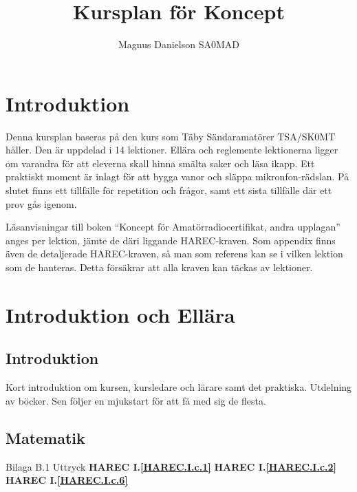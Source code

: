\documentclass[a4paper,twoside,openright]{article}
\begin{document}
\frontmatter

\title{Kursplan för Koncept}
\author{Magnus Danielson SA0MAD}
\maketitle

\section*{Introduktion}

Denna kursplan baseras på den kurs som Täby Sändaramatörer TSA/SK0MT håller.
Den är uppdelad i 14 lektioner.
Ellära och reglemente lektionerna ligger om varandra för att eleverna skall
hinna smälta saker och läsa ikapp.
Ett praktiskt moment är inlagt för att bygga vanor och släppa mikronfon-rädslan.
På slutet finns ett tillfälle för repetition och frågor, samt ett sista
tillfälle där ett prov gås igenom.

Läsanvisningar till boken ``Koncept för Amatörradiocertifikat, andra upplagan''
anges per lektion, jämte de däri liggande HAREC-kraven.
Som appendix finns även de detaljerade HAREC-kraven, så man som referens kan se
i vilken lektion som de hanteras.
Detta försäkrar att alla kraven kan täckas av lektioner.

\lfoot[\revision]{}
\rfoot[]{\revision}

\cleardoublepage
\pagestyle{fancy}


\tableofcontents

\setlength{\parindent}{0pt}
\setlength{\parskip}{1ex plus 0.5ex minus 0.2ex}

\mainmatter

\section{Introduktion och Ellära}

\subsection{Introduktion}

Kort introduktion om kursen, kursledare och lärare samt det praktiska.
Utdelning av böcker. Sen följer en mjukstart för att få med sig de flesta.

\subsection{Matematik}
Bilaga B.1 Uttryck
\textbf{HAREC I.\ref{HAREC.I.c.1}\label{myHAREC.I.c.1}}
\textbf{HAREC I.\ref{HAREC.I.c.2}\label{myHAREC.I.c.2}}
\textbf{HAREC I.\ref{HAREC.I.c.6}\label{myHAREC.I.c.6}}
\end{document}
